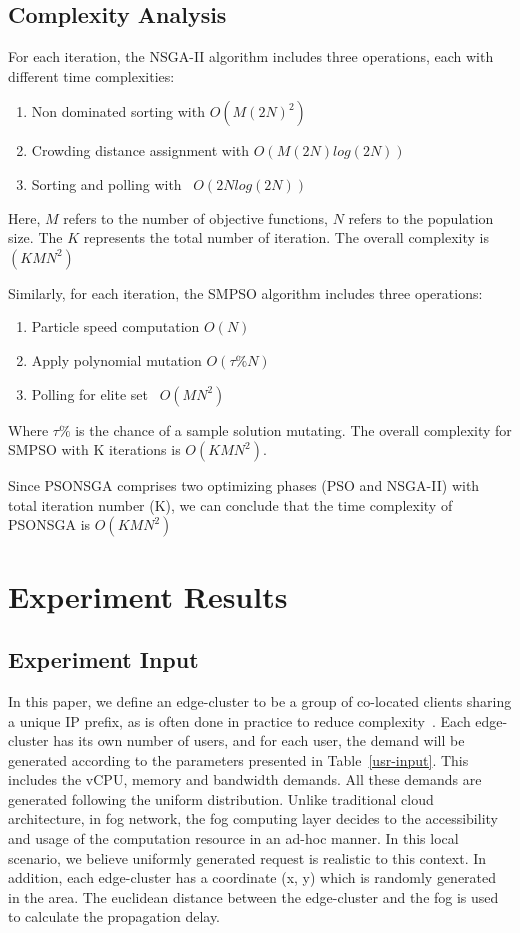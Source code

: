 \documentclass[10pt,journal,compsoc]{IEEEtran}
\begin{document}
\subsection{Complexity Analysis}
For each iteration, the NSGA-II algorithm includes three operations, each with different time complexities:
\begin{enumerate}
\item  Non dominated sorting with $O(M(2N)^2)$
\item Crowding distance assignment with
$O(M(2N)log(2N))$

\item Sorting and polling with ~$O(2N log(2N))$
\end{enumerate}
Here, $M$ refers to the number of objective functions, $N$ refers to the population size.
The $K$ represents the total number of iteration. The overall complexity is $(KMN^2)$ 

Similarly, for each iteration, the SMPSO algorithm includes three operations:
\begin{enumerate}
\item  Particle speed computation $O(N)$
\item  Apply polynomial mutation $O(\tau\% N)$
\item Polling for elite set ~$O(MN^2)$
\end{enumerate}
Where $\tau\%$ is the chance of a sample solution mutating.
The overall complexity for SMPSO with K iterations is $O(KMN^2)$.

Since PSONSGA comprises two optimizing phases (PSO and NSGA-II) with total iteration number (K), we can conclude that the time complexity of PSONSGA is $O(KMN^2)$

\section{Experiment Results}\label{express}

\subsection{Experiment Input}
In this paper, we define an edge-cluster to be a group of co-located clients sharing a unique IP prefix, as is often done in practice to reduce complexity~\cite{nygren2010akamai}. Each edge-cluster has its own number of users, and for each user, the demand will be generated according to the parameters presented in Table~\ref{usr-input}. This includes the vCPU, memory and bandwidth demands. All these demands are generated following the uniform distribution. Unlike traditional cloud architecture, in fog network, the fog computing layer decides to the accessibility and usage of the computation resource in an ad-hoc manner. In this local scenario, we believe uniformly generated request is realistic to this context. In addition, each edge-cluster has a coordinate (x, y) which is randomly generated in the area. The euclidean distance between the edge-cluster and the fog is used to calculate the propagation delay.
\end{document}
